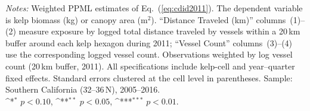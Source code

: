 \documentclass[12pt]{article}
\providecommand{\sym}[1]{\ifmmode^{#1}\else\(^{#1}\)\fi}
\begin{document}
\begin{table}[H]
  \centering
  \caption{Weighted PPML: Kelp outcomes and the 2011 boundary modification}
  \label{tab:weighted_2011}
  
  \vspace{0.5em}

  \begin{minipage}{\linewidth}
  \footnotesize
  \textit{Notes:} Weighted PPML estimates of Eq.~(\ref{eq:cdid2011}). The dependent variable is kelp biomass (kg) or canopy area (m$^{2}$). ``Distance Traveled (km)'' columns~(1)--(2) measure exposure by logged total distance traveled by vessels within a 20\,km buffer around each kelp hexagon during 2011; ``Vessel Count'' columns~(3)--(4) use the corresponding logged vessel count. Observations weighted by log vessel count (20\,km buffer, 2011). All specifications include kelp-cell and year--quarter fixed effects. Standard errors clustered at the cell level in parentheses. Sample: Southern California (32\textdegree--36\textdegree\,N), 2005--2016.\\
  \sym{*} \(p<0.10\), \sym{**} \(p<0.05\), \sym{***} \(p<0.01\).
  \end{minipage}
\end{table}
\end{document}
